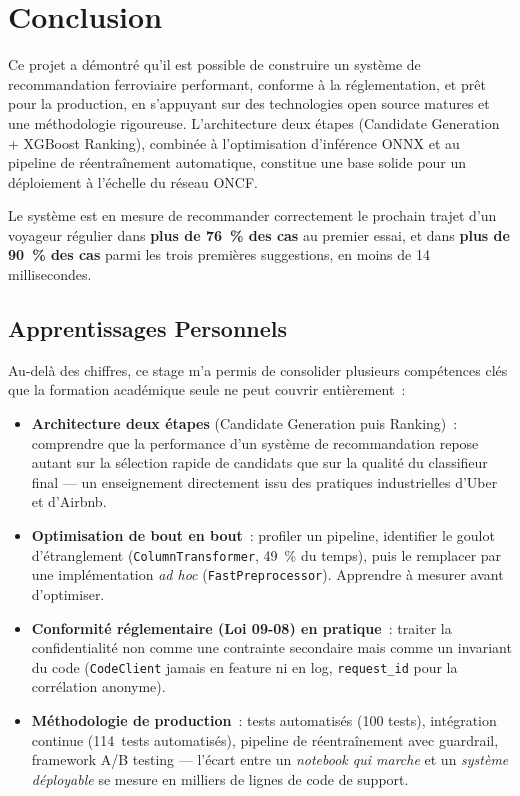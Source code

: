 \documentclass[12pt, a4paper]{report}
\begin{document}
\section{Conclusion}

Ce projet a démontré qu'il est possible de construire un système de
recommandation ferroviaire performant, conforme à la réglementation, et
prêt pour la production, en s'appuyant sur des technologies open source
matures et une méthodologie rigoureuse. L'architecture deux étapes
(Candidate Generation + XGBoost Ranking), combinée à l'optimisation
d'inférence ONNX et au pipeline de réentraînement automatique, constitue
une base solide pour un déploiement à l'échelle du réseau ONCF.

Le système est en mesure de recommander correctement le prochain trajet d'un
voyageur régulier dans \textbf{plus de 76~\% des cas} au premier essai, et
dans \textbf{plus de 90~\% des cas} parmi les trois premières suggestions,
en moins de 14 millisecondes.

\subsection*{Apprentissages Personnels}

Au-delà des chiffres, ce stage m'a permis de consolider plusieurs
compétences clés que la formation académique seule ne peut couvrir
entièrement~:

\begin{itemize}
\item \textbf{Architecture deux étapes} (Candidate Generation puis
    Ranking)~: comprendre que la performance d'un système de recommandation
    repose autant sur la sélection rapide de candidats que sur la qualité
    du classifieur final --- un enseignement directement issu des pratiques
    industrielles d'Uber et d'Airbnb.
\item \textbf{Optimisation de bout en bout}~: profiler un pipeline,
    identifier le goulot d'étranglement (\texttt{ColumnTransformer}, 49~\%
    du temps), puis le remplacer par une implémentation \textit{ad hoc}
    (\texttt{FastPreprocessor}). Apprendre à mesurer avant d'optimiser.
\item \textbf{Conformité réglementaire (Loi 09-08) en pratique}~: traiter
    la confidentialité non comme une contrainte secondaire mais comme un
    invariant du code (\texttt{CodeClient} jamais en feature ni en log,
    \texttt{request\_id} pour la corrélation anonyme).
\item \textbf{Méthodologie de production}~: tests automatisés (100 tests),
    intégration continue (114~tests automatisés), pipeline de réentraînement
    avec guardrail, framework A/B testing --- l'écart entre un
    \textit{notebook qui marche} et un \textit{système déployable} se mesure
    en milliers de lignes de code de support.
\end{itemize}
\end{document}
